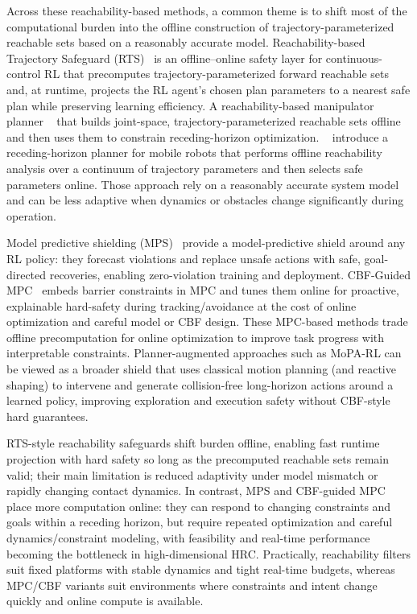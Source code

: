 \documentclass[Afour,sageh,times]{template/sagej}
\begin{document}
Across these reachability-based methods, a common theme is to shift most of the computational burden into the offline construction of trajectory-parameterized reachable sets based on a reasonably accurate model. Reachability-based Trajectory Safeguard (RTS)~\cite{Shao2021RTS} is an offline--online safety layer for continuous-control RL that precomputes trajectory-parameterized forward reachable sets and, at runtime, projects the RL agent's chosen plan parameters to a nearest safe plan while preserving learning efficiency. A reachability-based manipulator planner ~\cite{Holmes-RSS-20} that builds joint-space, trajectory-parameterized reachable sets offline and then uses them to constrain receding-horizon optimization. ~\cite{kousik2020bridging} introduce a receding-horizon planner for mobile robots that performs offline reachability analysis over a continuum of trajectory parameters and then selects safe parameters online. Those approach rely on a reasonably accurate system model and can be less adaptive when dynamics or obstacles change significantly during operation.


Model predictive shielding (MPS)~\cite{banerjee2024dynamic} provide a model-predictive shield around any RL policy: they forecast violations and replace unsafe actions with safe, goal-directed recoveries, enabling zero-violation training and deployment. CBF-Guided MPC~\cite{liu2025flexible} embeds barrier constraints in MPC and tunes them online for proactive, explainable hard-safety during tracking/avoidance at the cost of online optimization and careful model or CBF design.
These MPC-based methods trade offline precomputation for online optimization to improve task progress with interpretable constraints. Planner-augmented approaches such as MoPA-RL \cite{99} can be viewed as a broader shield that uses classical motion planning (and reactive shaping) to intervene and generate collision-free long-horizon actions around a learned policy, improving exploration and execution safety without CBF-style hard guarantees.

RTS-style reachability safeguards shift burden offline, enabling fast runtime projection with hard safety so long as the precomputed reachable sets remain valid; their main limitation is reduced adaptivity under model mismatch or rapidly changing contact dynamics. In contrast, MPS and CBF-guided MPC place more computation online: they can respond to changing constraints and goals within a receding horizon, but require repeated optimization and careful dynamics/constraint modeling, with feasibility and real-time performance becoming the bottleneck in high-dimensional HRC. Practically, reachability filters suit fixed platforms with stable dynamics and tight real-time budgets, whereas MPC/CBF variants suit environments where constraints and intent change quickly and online compute is available.
\end{document}
